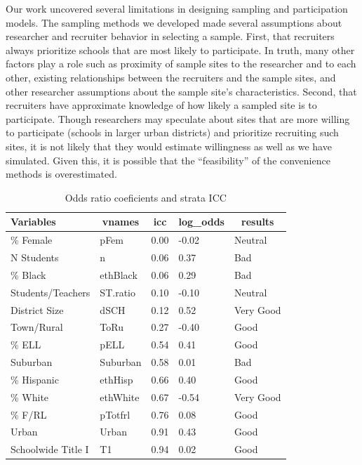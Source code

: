 \documentclass[man,floatsintext]{apa6}
\begin{document}
Our work uncovered several limitations in designing sampling and participation models. The sampling methods we developed made several assumptions about researcher and recruiter behavior in selecting a sample. First, that recruiters always prioritize schools that are most likely to participate. In truth, many other factors play a role such as proximity of sample sites to the researcher and to each other, existing relationships between the recruiters and the sample sites, and other researcher assumptions about the sample site's characteristics. Second, that recruiters have approximate knowledge of how likely a sampled site is to participate. Though researchers may speculate about sites that are more willing to participate (schools in larger urban districts) and prioritize recruiting such sites, it is not likely that they would estimate willingness as well as we have simulated. Given this, it is possible that the \enquote{feasibility} of the convenience methods is overestimated.

\begin{table}[tbp]
\begin{center}
\begin{threeparttable}
\caption{\label{tab:tab-ICC-Pars}Odds ratio coeficients and strata ICC}
\begin{tabular}{lllll}
\toprule
Variables & \multicolumn{1}{c}{vnames} & \multicolumn{1}{c}{icc} & \multicolumn{1}{c}{log\_odds} & \multicolumn{1}{c}{results}\\
\midrule
\% Female & pFem & 0.00 & -0.02 & Neutral\\
N Students & n & 0.06 & 0.37 & Bad\\
\% Black & ethBlack & 0.06 & 0.29 & Bad\\
Students/Teachers & ST.ratio & 0.10 & -0.10 & Neutral\\
District Size & dSCH & 0.12 & 0.52 & Very Good\\
Town/Rural & ToRu & 0.27 & -0.40 & Good\\
\% ELL & pELL & 0.54 & 0.41 & Good\\
Suburban & Suburban & 0.58 & 0.01 & Bad\\
\% Hispanic & ethHisp & 0.66 & 0.40 & Good\\
\% White & ethWhite & 0.67 & -0.54 & Very Good\\
\% F/RL & pTotfrl & 0.76 & 0.08 & Good\\
Urban & Urban & 0.91 & 0.43 & Good\\
Schoolwide Title I & T1 & 0.94 & 0.02 & Good\\
\bottomrule
\end{tabular}
\end{threeparttable}
\end{center}
\end{table}
\end{document}

